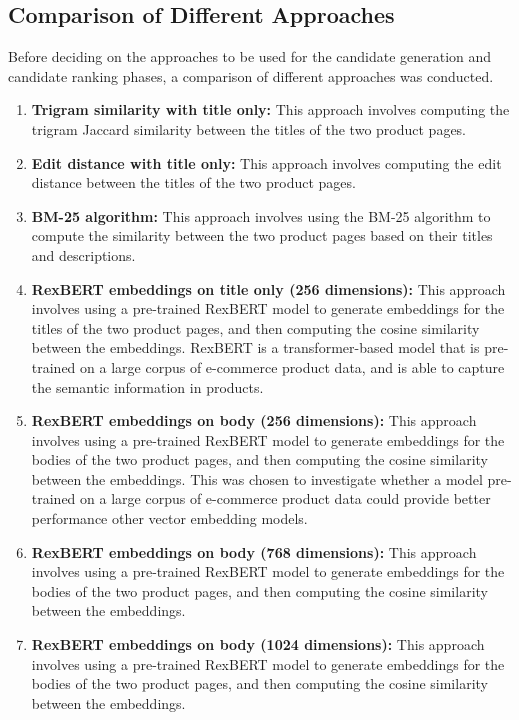 \subsection{Comparison of Different Approaches}\label{subsec:sec_product_matching_comparison_of_approaches}
Before deciding on the approaches to be used for the candidate generation and candidate ranking phases, a comparison of different approaches was conducted.
\begin{enumerate}
    \item \textbf{Trigram similarity with title only:} This approach involves computing the trigram Jaccard similarity between the titles of the two product pages.
    \item \textbf{Edit distance with title only:} This approach involves computing the edit distance between the titles of the two product pages.
    \item \textbf{BM-25 algorithm:} This approach involves using the BM-25 algorithm to compute the similarity between the two product pages based on their titles and descriptions.
    \item \textbf{RexBERT embeddings on title only (256 dimensions):} This approach involves using a pre-trained RexBERT model to generate embeddings for the titles of the two product pages, and then computing the cosine similarity between the embeddings.
    RexBERT is a transformer-based model that is pre-trained on a large corpus of e-commerce product data, and is able to capture the semantic information in products.
    \item \textbf{RexBERT embeddings on body (256 dimensions):} This approach involves using a pre-trained RexBERT model to generate embeddings for the bodies of the two product pages, and then computing the cosine similarity between the embeddings.
    This was chosen to investigate whether a model pre-trained on a large corpus of e-commerce product data could provide better performance other vector embedding models.
    \item \textbf{RexBERT embeddings on body (768 dimensions):} This approach involves using a pre-trained RexBERT model to generate embeddings for the bodies of the two product pages, and then computing the cosine similarity between the embeddings.
    \item \textbf{RexBERT embeddings on body (1024 dimensions):} This approach involves using a pre-trained RexBERT model to generate embeddings for the bodies of the two product pages, and then computing the cosine similarity between the embeddings.

\end{enumerate}
